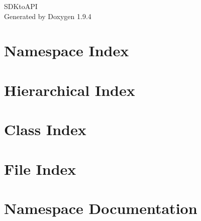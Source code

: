 \documentclass[twoside]{book}
\newcommand{\+}{\discretionary{\mbox{\scriptsize$\hookleftarrow$}}{}{}}
\newcommand{\clearemptydoublepage}{%
    \newpage{\pagestyle{empty}\cleardoublepage}%
  }
\begin{document}
  \raggedbottom
    \hypersetup{pageanchor=false,
                bookmarksnumbered=true,
                pdfencoding=unicode
               }
  \begin{titlepage}
  \vspace*{7cm}
  \begin{center}%
  {\Large SDKto\+API}\\
  \vspace*{1cm}
  {\large Generated by Doxygen 1.9.4}\\
  \end{center}
  \end{titlepage}
  \clearemptydoublepage
  \tableofcontents
  \clearemptydoublepage
  \hypersetup{pageanchor=true}
\chapter{Namespace Index}

\chapter{Hierarchical Index}

\chapter{Class Index}

\chapter{File Index}

\chapter{Namespace Documentation}










\end{document}
